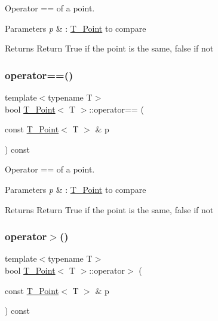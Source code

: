 Operator == of a point. 


\begin{DoxyParams}{Parameters}
{\em p} & \+: \hyperlink{classT__Point}{T\+\_\+\+Point} to compare \\
\hline
\end{DoxyParams}
\begin{DoxyReturn}{Returns}
Return True if the point is the same, false if not 
\end{DoxyReturn}
\mbox{\label{classT__Point_a83c15f53049523cc75c23350ceb4832a}} 
\subsubsection{\texorpdfstring{operator==()}{operator==()}\hspace{0.1cm}{\footnotesize\ttfamily [2/2]}}
{\footnotesize\ttfamily template$<$typename T$>$ \\
bool \hyperlink{classT__Point}{T\+\_\+\+Point}$<$ T $>$\+::operator== (\begin{DoxyParamCaption}\item[{const \hyperlink{classT__Point}{T\+\_\+\+Point}$<$ T $>$ \&}]{p }\end{DoxyParamCaption}) const\hspace{0.3cm}{\ttfamily [inline]}}



Operator == of a point. 


\begin{DoxyParams}{Parameters}
{\em p} & \+: \hyperlink{classT__Point}{T\+\_\+\+Point} to compare \\
\hline
\end{DoxyParams}
\begin{DoxyReturn}{Returns}
Return True if the point is the same, false if not 
\end{DoxyReturn}
\mbox{\label{classT__Point_a0a9956de8ab7c8dccf35b78c43aedefd}} 
\subsubsection{\texorpdfstring{operator$>$()}{operator>()}\hspace{0.1cm}{\footnotesize\ttfamily [1/2]}}
{\footnotesize\ttfamily template$<$typename T$>$ \\
bool \hyperlink{classT__Point}{T\+\_\+\+Point}$<$ T $>$\+::operator$>$ (\begin{DoxyParamCaption}\item[{const \hyperlink{classT__Point}{T\+\_\+\+Point}$<$ T $>$ \&}]{p }\end{DoxyParamCaption}) const\hspace{0.3cm}{\ttfamily [inline]}}



